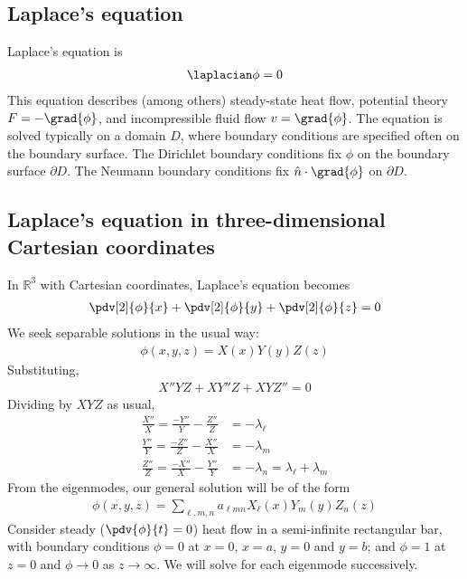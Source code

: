 \subsection{Laplace's equation}
Laplace's equation is
\begin{align*}
	\laplacian \phi = 0
\end{align*}
This equation describes (among others) steady-state heat flow, potential theory $F = -\grad{\phi}$, and incompressible fluid flow $v = \grad{\phi}$.
The equation is solved typically on a domain $D$, where boundary conditions are specified often on the boundary surface.
The Dirichlet boundary conditions fix $\phi$ on the boundary surface $\partial D$.
The Neumann boundary conditions fix $\hat n \cdot \grad{\phi}$ on $\partial D$.

\subsection{Laplace's equation in three-dimensional Cartesian coordinates}
In $\mathbb R^3$ with Cartesian coordinates, Laplace's equation becomes
\begin{align*}
	\pdv[2]{\phi}{x} + \pdv[2]{\phi}{y} + \pdv[2]{\phi}{z} = 0
\end{align*}
We seek separable solutions in the usual way:
\begin{align*}
	\phi(x,y,z) = X(x)Y(y)Z(z)
\end{align*}
Substituting,
\begin{align*}
	X''YZ + XY''Z + XYZ'' = 0
\end{align*}
Dividing by $XYZ$ as usual,
\begin{align*}
	\frac{X''}{X} = \frac{-Y''}{Y} - \frac{Z''}{Z} & = -\lambda_\ell                         \\
	\frac{Y''}{Y} = \frac{-Z''}{Z} - \frac{X''}{X} & = -\lambda_m                            \\
	\frac{Z''}{Z} = \frac{-X''}{X} - \frac{Y''}{Y} & = -\lambda_n = \lambda_\ell + \lambda_m
\end{align*}
From the eigenmodes, our general solution will be of the form
\begin{align*}
	\phi(x,y,z) = \sum_{\ell,m,n} a_{\ell mn} X_\ell(x) Y_m(y) Z_n(z)
\end{align*}
Consider steady ($\pdv{\phi}{t} = 0$) heat flow in a semi-infinite rectangular bar, with boundary conditions $\phi = 0$ at $x = 0$, $x = a$, $y = 0$ and $y = b$; and $\phi = 1$ at $z = 0$ and $\phi \to 0$ as $z \to \infty$.
We will solve for each eigenmode successively.
